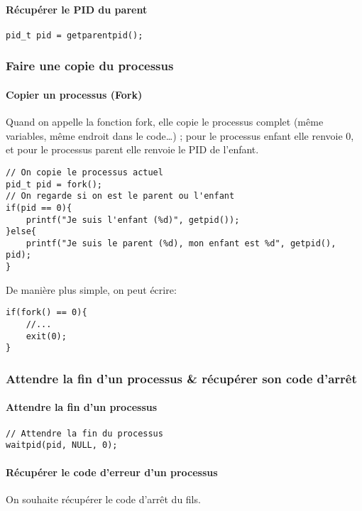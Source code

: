 \documentclass[10pt,a4paper,french]{article}
\begin{document}
\paragraph{Récupérer le PID du parent}
\begin{verbatim}
pid_t pid = getparentpid();
\end{verbatim}

\subsubsection{Faire une copie du processus}

\paragraph{Copier un processus (Fork)}
Quand on appelle la fonction fork, elle copie le processus complet (même variables, même endroit dans le code\ldots) ; pour le processus enfant elle renvoie 0, et pour le processus parent elle renvoie le PID de l'enfant.
\begin{verbatim}
// On copie le processus actuel
pid_t pid = fork();
// On regarde si on est le parent ou l'enfant
if(pid == 0){
    printf("Je suis l'enfant (%d)", getpid());
}else{
    printf("Je suis le parent (%d), mon enfant est %d", getpid(), pid);
}
\end{verbatim}

De manière plus simple, on peut écrire:
\begin{verbatim}
if(fork() == 0){
    //...
    exit(0);
}
\end{verbatim}

\subsubsection{Attendre la fin d'un processus \& récupérer son code d'arrêt}

\paragraph{Attendre la fin d'un processus}
\begin{verbatim}
// Attendre la fin du processus
waitpid(pid, NULL, 0);
\end{verbatim}

\paragraph{Récupérer le code d'erreur d'un processus}
On souhaite récupérer le code d'arrêt du fils.
\end{document}
